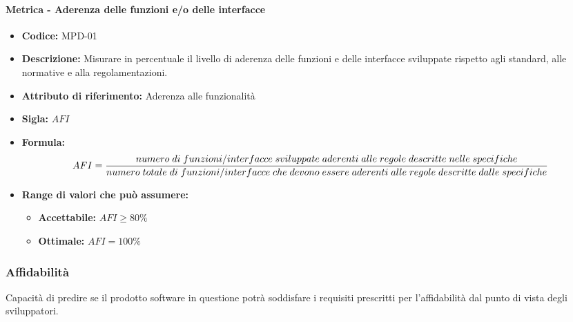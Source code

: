               \paragraph{Metrica - Aderenza delle funzioni e/o delle interfacce} 
              \begin{itemize}
          \item  \textbf{Codice:} MPD-01
        \item    \textbf{Descrizione:} Misurare in percentuale il livello di aderenza delle funzioni e delle interfacce sviluppate rispetto agli standard, alle normative e alla regolamentazioni.
          \item  \textbf{Attributo di riferimento:} Aderenza alle funzionalità 
        \item    \textbf{Sigla:} $AFI$
         \item   \textbf{Formula:} $$AFI = {numero \; di \; funzioni/interfacce \; sviluppate \; aderenti \; alle \; regole\; descritte \; nelle \; specifiche \over numero \; totale \; di \; funzioni/interfacce \; che \; devono \; essere \; aderenti \; alle \; regole \; descritte \; dalle \; specifiche }$$

                \item \textbf{Range di valori che può assumere:}
                \begin{itemize}
                    \item \textbf{Accettabile:} $AFI  \geq 80\% $
                    \item \textbf{Ottimale:} $AFI = 100\%$
                \end{itemize}
            \end{itemize}
              
  \subsubsection{Affidabilità} 
  Capacità di predire se il prodotto software in questione potrà soddisfare i requisiti prescritti per l'affidabilità dal punto di vista degli sviluppatori.
